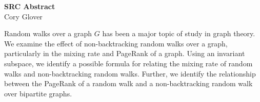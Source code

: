 \documentclass[11pt]{article}
\begin{document}
\begin{center}
\textbf{SRC Abstract}
\\ Cory Glover
\end{center}

Random walks over a graph $G$ has been a major topic of study in graph theory. We examine the effect of non-backtracking random walks over a graph, particularly in the mixing rate and PageRank of a graph. Using an invariant subspace, we identify a possible formula for relating the mixing rate of random walks and non-backtracking random walks. Further, we identify the relationship between the PageRank of a random walk and a non-backtracking random walk over bipartite graphs.
\end{document}
